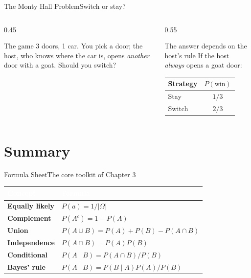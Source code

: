 \documentclass[aspectratio=169,11pt]{beamer}
\begin{document}
\begin{frame}{The Monty Hall Problem}{Switch or stay?}
  \begin{columns}[T]
    \begin{column}{0.45\textwidth}
      \begin{block}{The game}
        \small 3 doors, 1 car. You pick a door; the host, who knows where
        the car is, opens \emph{another} door with a goat. Should you
        switch?
      \end{block}
    \end{column}
    \begin{column}{0.55\textwidth}
      \begin{exampleblock}{The answer depends on the host's rule}
        \small If the host \emph{always} opens a goat door:
        \renewcommand{\arraystretch}{1.3}
        \begin{center}
        \begin{tabular}{@{}lc@{}}
          \toprule
          Strategy & $P(\text{win})$ \\
          \midrule
          Stay & $1/3$ \\
          \rowcolor{PrimaryLight!25}
          Switch & $2/3$ \\
          \bottomrule
        \end{tabular}
        \end{center}
      \end{exampleblock}
    \end{column}
  \end{columns}
\end{frame}

\section{Summary}

\begin{frame}{Formula Sheet}{The core toolkit of Chapter 3}
  \small
  \renewcommand{\arraystretch}{1.3}
  \begin{center}
  \begin{tabularx}{\textwidth}{@{}>{\bfseries}l >{\raggedright\arraybackslash}X@{}}
    \toprule
    \rowcolor{PrimaryDark}
    \textcolor{white}{Concept} & \textcolor{white}{Formula} \\
    \midrule
    Equally likely & $P(a) = 1/|\Omega|$ \\
    \rowcolor{PrimaryLight!25}
    Complement & $P(A^c) = 1-P(A)$ \\
    Union & $P(A\cup B) = P(A)+P(B)-P(A\cap B)$ \\
    \rowcolor{PrimaryLight!25}
    Independence & $P(A\cap B) = P(A)P(B)$ \\
    Conditional & $P(A\mid B) = P(A\cap B)/P(B)$ \\
    \rowcolor{PrimaryLight!25}
    Bayes' rule & $P(A\mid B) = P(B\mid A)P(A)/P(B)$ \\
    \bottomrule
  \end{tabularx}
  \end{center}
\end{frame}
\end{document}

